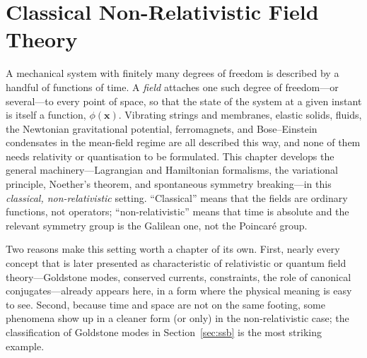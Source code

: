 \providecommand{\fd}[2]{\frac{\delta #1}{\delta #2}}
\providecommand{\pd}[2]{\frac{\partial #1}{\partial #2}}
\providecommand{\PB}[2]{\{#1,\,#2\}}
\providecommand{\dd}{\mathrm{d}}
\providecommand{\ii}{\mathrm{i}}
\providecommand{\Lag}{\mathcal{L}}
\providecommand{\Ham}{\mathcal{H}}
\providecommand{\Imag}{\operatorname{Im}}
\providecommand{\eps}{\varepsilon}

\chapter{Classical Non-Relativistic Field Theory}
\label{ch:cnr-field}

A mechanical system with finitely many degrees of freedom is described by a
handful of functions of time. A \emph{field} attaches one such degree of
freedom---or several---to every point of space, so that the state of the system
at a given instant is itself a function, $\phi(\mathbf{x})$. Vibrating strings
and membranes, elastic solids, fluids, the Newtonian gravitational potential,
ferromagnets, and Bose--Einstein condensates in the mean-field regime are all
described this way, and none of them needs relativity or quantisation to be
formulated. This chapter develops the general machinery---Lagrangian and
Hamiltonian formalisms, the variational principle, Noether's theorem, and
spontaneous symmetry breaking---in this \emph{classical, non-relativistic}
setting. ``Classical'' means that the fields are ordinary functions, not
operators; ``non-relativistic'' means that time is absolute and the relevant
symmetry group is the Galilean one, not the Poincar\'e group.

Two reasons make this setting worth a chapter of its own. First, nearly every
concept that is later presented as characteristic of relativistic or quantum field
theory---Goldstone modes, conserved currents, constraints, the role of
canonical conjugates---already appears here, in a form where the physical
meaning is easy to see. Second, because time and space are not on the same
footing, some phenomena show up in a cleaner form (or only) in the
non-relativistic case; the classification of Goldstone modes in
Section~\ref{sec:ssb} is the most striking example.

